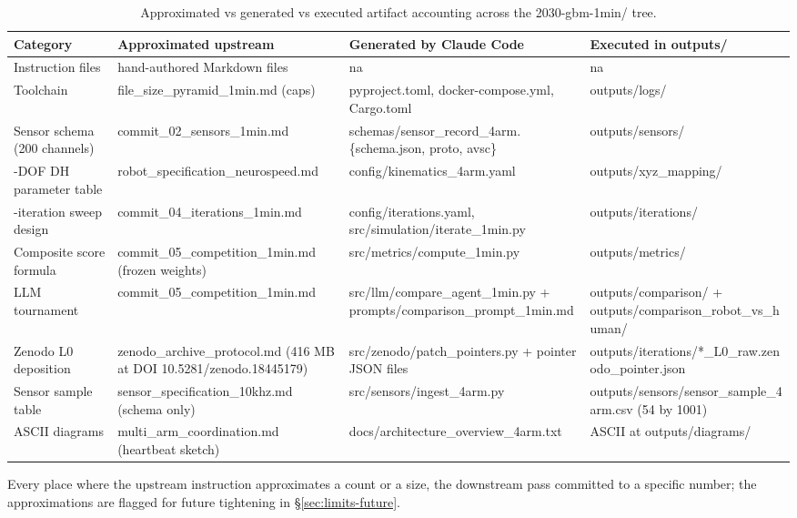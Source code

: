 \begin{table}[H]
\centering
\caption{Approximated vs generated vs executed artifact accounting
across the 2030-gbm-1min/ tree.}
\label{tab:accounting}
\begin{tabular}{>{\raggedright\arraybackslash}p{3.0cm}
                >{\raggedright\arraybackslash}p{4.0cm}
                >{\raggedright\arraybackslash}p{4.0cm}
                >{\raggedright\arraybackslash}p{3.5cm}}
\toprule
\textbf{Category} & \textbf{Approximated upstream} & \textbf{Generated by Claude Code} & \textbf{Executed in outputs/} \\
\midrule
Instruction files & 12 hand-authored Markdown files & na & na \\
Toolchain & file_size_pyramid_1min.md (caps) & pyproject.toml, docker-compose.yml, Cargo.toml & outputs/logs/ \\
Sensor schema (200 channels) & commit_02_sensors_1min.md & schemas/sensor_record_4arm.\{schema.json, proto, avsc\} & outputs/sensors/ \\
7-DOF DH parameter table & robot_specification_neurospeed.md & config/kinematics_4arm.yaml & outputs/xyz_mapping/ \\
16-iteration sweep design & commit_04_iterations_1min.md & config/iterations.yaml, src/simulation/iterate_1min.py & outputs/iterations/ \\
Composite score formula & commit_05_competition_1min.md (frozen weights) & src/metrics/compute_1min.py & outputs/metrics/ \\
LLM tournament & commit_05_competition_1min.md & src/llm/compare_agent_1min.py + prompts/comparison_prompt_1min.md & outputs/comparison/ + outputs/comparison_robot_vs_human/ \\
Zenodo L0 deposition & zenodo_archive_protocol.md (416 MB at DOI 10.5281/zenodo.18445179) & src/zenodo/patch_pointers.py + pointer JSON files & outputs/iterations/*_L0_raw.zenodo_pointer.json \\
Sensor sample table & sensor_specification_10khz.md (schema only) & src/sensors/ingest_4arm.py & outputs/sensors/sensor_sample_4arm.csv (54 by 1001) \\
ASCII diagrams & multi_arm_coordination.md (heartbeat sketch) & docs/architecture_overview_4arm.txt & 6 ASCII at outputs/diagrams/ \\
\bottomrule
\end{tabular}
\end{table}

Every place where the upstream instruction approximates a count or a
size, the downstream pass committed to a specific number; the
approximations are flagged for future tightening in
\S\ref{sec:limits-future}.

